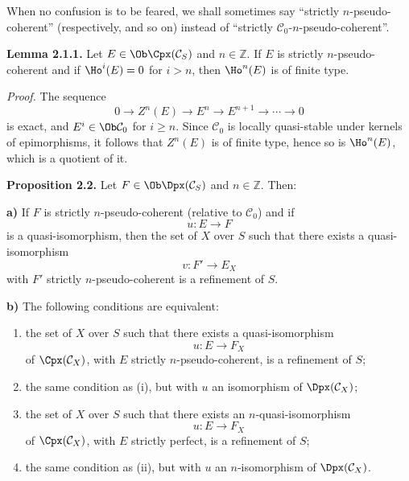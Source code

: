 When no confusion is to be feared, we shall sometimes say ``strictly \(n\)-pseudo-coherent'' (respectively, and so on) instead of ``strictly \(\mathcal C_0\)-\(n\)-pseudo-coherent''.

\textbf{Lemma 2.1.1.} Let \(E\in\Ob\Cpx(\mathcal C_S)\) and \(n\in\mathbb Z\). If \(E\) is strictly \(n\)-pseudo-coherent and if \(\Ho^i(E)=0\) for \(i>n\), then \(\Ho^n(E)\) is of finite type.

\emph{Proof.} The sequence
\[
  0\longrightarrow Z^n(E)\longrightarrow E^n\longrightarrow E^{n+1}\longrightarrow\cdots\longrightarrow 0
\]
is exact, and \(E^i\in\Ob\mathcal C_0\) for \(i\geq n\). Since \(\mathcal C_0\) is locally quasi-stable under kernels of epimorphisms, it follows that \(Z^n(E)\) is of finite type, hence so is \(\Ho^n(E)\), which is a quotient of it.

\textbf{Proposition 2.2.} Let \(F\in\Ob\Dpx(\mathcal C_S)\) and \(n\in\mathbb Z\). Then:

\textbf{a)} If \(F\) is strictly \(n\)-pseudo-coherent (relative to \(\mathcal C_0\)) and if
\[
  u:E\longrightarrow F
\]
is a quasi-isomorphism, then the set of \(X\) over \(S\) such that there exists a quasi-isomorphism
\[
  v:F'\longrightarrow E_X
\]
with \(F'\) strictly \(n\)-pseudo-coherent is a refinement of \(S\).

\textbf{b)} The following conditions are equivalent:
\begin{enumerate}[label=(\roman*)]
\item the set of \(X\) over \(S\) such that there exists a quasi-isomorphism
\[
  u:E\longrightarrow F_X
\]
of \(\Cpx(\mathcal C_X)\), with \(E\) strictly \(n\)-pseudo-coherent, is a refinement of \(S\);
\item[\((\mathrm{i}')\)] the same condition as (i), but with \(u\) an isomorphism of \(\Dpx(\mathcal C_X)\);
\item the set of \(X\) over \(S\) such that there exists an \(n\)-quasi-isomorphism
\[
  u:E\longrightarrow F_X
\]
of \(\Cpx(\mathcal C_X)\), with \(E\) strictly perfect, is a refinement of \(S\);
\item[\((\mathrm{ii}')\)] the same condition as (ii), but with \(u\) an \(n\)-isomorphism of \(\Dpx(\mathcal C_X)\).
\end{enumerate}

